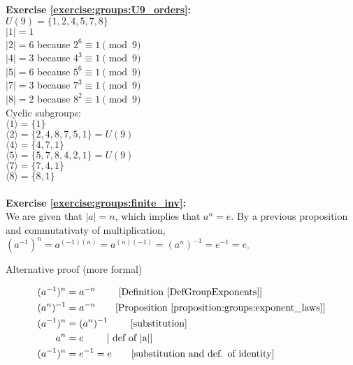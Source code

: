 \noindent\textbf{Exercise \ref{exercise:groups:U9_orders}:}\\
$U(9)=\{1,2,4,5,7,8\}$\\
$|1|=1$\\
$|2|=6$ because $2^6\equiv 1\pmod{9}$\\
$|4|=3$ because $4^3\equiv 1\pmod{9}$\\
$|5|=6$ because $5^6\equiv 1\pmod{9}$\\
$|7|=3$ because $7^3\equiv 1\pmod{9}$\\
$|8|=2$ because $8^2\equiv 1\pmod{9}$\\
Cyclic subgroups:\\
$\langle1\rangle=\{1\}$\\
$\langle2\rangle=\{2,4,8,7,5,1\}=U(9)$\\
$\langle4\rangle=\{4,7,1\}$\\
$\langle5\rangle=\{5,7,8,4,2,1\}=U(9)$\\
$\langle7\rangle=\{7,4,1\}$\\
$\langle8\rangle=\{8,1\}$\\
\\

\noindent\textbf{Exercise \ref{exercise:groups:finite_inv}:}\\
We are given that $|a|=n$, which implies that $a^n=e$. By a previous proposition and commutativaty of multiplication, $(a^{-1})^n = a^{(-1)(n)} = a^{(n)(-1)} = (a^n)^{-1} = e^{-1} = e$. 

Alternative proof (more formal)

\begin{align*}
(a^{-1})^n &= a^{-n} \qquad \textrm{ [Definition \ref{DefGroupExponents}]}\\
(a^n)^{-1} &= a^{-n} \qquad \textrm{[Proposition  \ref{proposition:groups:exponent_laws}]}\\
(a^{-1})^n &= (a^n)^{-1} \qquad \textrm{ [substitution]}\\ 
a^n &= e \qquad \textrm{  [ def of  |a|]} \\
(a^{-1})^n &= e^{-1} = e  \qquad \textrm{[substitution and def. of identity]}
\end{align*}

